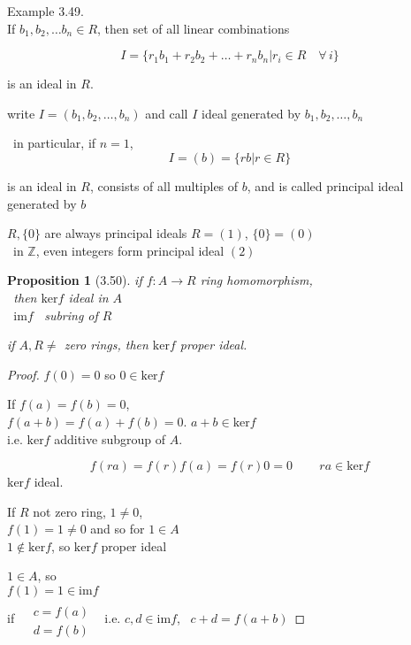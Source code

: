 \documentclass[twoside,landscape]{amsart}
\theoremstyle{plain}
\newtheorem{proposition}{Proposition}
\theoremstyle{definition}
\theoremstyle{remark}
\begin{document}
\begin{multicols*}{2}
Example 3.49.  \\

If $b_1, b_2, \dots b_n \in R$, then set of all linear combinations

\[
I = \lbrace r_1 b_1 + r_2 b_2 + \dots + r_n b_n | r_i \in R \quad \forall \, i \rbrace
\]

is an ideal in $R$.  

write $I = (b_1, b_2, \dots , b_n)$ and call $I$ ideal generated by $b_1, b_2, \dots , b_n$

\, in particular, if $n=1$, 
\[
I = (b) = \lbrace rb | r \in R \rbrace
\]

is an ideal in $R$, consists of all multiples of $b$, and is called principal ideal generated by $b$ 

$R, \lbrace 0 \rbrace$ are always principal ideals $R=(1)$, $\lbrace 0 \rbrace = (0)$ \\
\, in $\mathbb{Z}$, even integers form principal ideal $(2)$



\begin{proposition}[3.50]
  if $f:A \to R$ ring homomorphism, \\
\, then $\text{ker}{f}$ ideal in $A$ \\
\, \phantom{then } $\text{im}{f}$ \, subring of $R$ 

if $A,R \neq $ zero rings, then $\text{ker}{f}$ proper ideal.  
\end{proposition}

\begin{proof}
$f(0) = 0$ so $0 \in \text{ker}{f}$

If $f(a) = f(b) =0 $, \\
$f(a+b) = f(a) + f(b) = 0$.  $a+b \in \text{ker}{f}$ \\
i.e. $\text{ker}{f}$ additive subgroup of $A$.  

\[
f(ra) = f(r)f(a) = f(r) 0 = 0 \quad \quad \, ra \in \text{ker}{f}
\]
$\text{ker}{f}$ ideal.  


If $R$ not zero ring, $1\neq 0$, \\
\phantom{if } $f(1) = 1 \neq 0$ and so for $1\in A$ \\
\phantom{if } \quad \quad $1 \notin \text{ker}{f}$, so $\text{ker}{f}$ proper ideal

$1 \in A$, so \\
$f(1) = 1 \in \text{im}{f}$ \\
if $\begin{aligned} & \quad \\ 
  & c = f(a) \\ 
  & d = f(b) \end{aligned}$ \, i.e. $c,d \in \text{im}{f}$, \, $c+d = f(a+b)$ 


\end{proof}
\end{multicols*}
\end{document}
